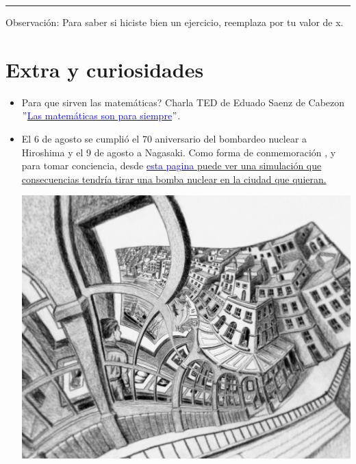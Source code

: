 \documentclass[a4paper,11pt,spanish,sans]{exam}
\begin{document}
\rule[2ex]{\textwidth}{2pt}


Observación: Para saber si hiciste bien un ejercicio, reemplaza por tu valor de x.



\section*{Extra y curiosidades}

\begin{itemize}
\item Para que sirven las matemáticas? Charla TED de Eduado Saenz de Cabezon \href{https://www.youtube.com/watch?v=jej8qlzlAGw}{\textcolor{blue}{ $"$Las matemáticas son para siempre$"$}}.

\item El 6 de agosto se cumplió el 70 aniversario del bombardeo nuclear a Hiroshima y el 9 de agosto a Nagasaki. Como forma de conmemoración , y para tomar conciencia, desde  \href{http://nuclearsecrecy.com/nukemap/}{\textcolor{blue}{esta pagina} puede ver una simulación que consecuencias tendría tirar una bomba nuclear en la ciudad que quieran.}

 

\begin{minipage}{0.5\textwidth}

\centering
\includegraphics[width= 0.8\linewidth]{esch.jpg}
\label{fig:univerise}

\end{minipage}
\begin{minipage}{0.5\textwidth}


\end{minipage}
\end{itemize}
\end{document}
